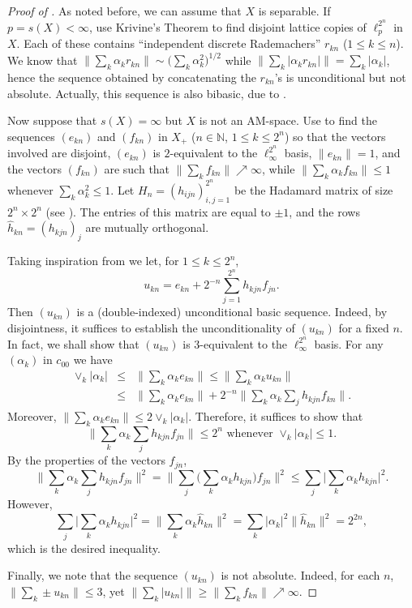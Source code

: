 \documentclass[12pt,leqno]{amsart}
\numberwithin{equation}{section}
\theoremstyle{definition}
\def\N{{\mathbb N}}
\begin{document}
\begin{proof}[Proof of ] 
As noted before, we can assume that $X$ is separable. If $p = s(X) < \infty$, use Krivine's Theorem to find disjoint lattice copies of $\ell_p^{2^n}$ in $X$.
Each of these contains ``independent discrete Rademachers'' $r_{kn}$ ($1 \leq k \leq n$). We know that $\| \sum_k \alpha_k r_{kn} \| \sim \big( \sum_k \alpha_k^2 \big)^{1/2}$ while $\| \sum_k |\alpha_k r_{kn}| \| = \sum_k |\alpha_k|$, hence the sequence obtained by concatenating the $r_{kn}$'s is  unconditional but not absolute. Actually, this sequence is also bibasic, due to \cite{TT19}.
 \medskip
 
 Now suppose that $s(X) = \infty$ but $X$ is not an AM-space. Use  to find the sequences $(e_{kn})$ and $(f_{kn})$ in $X_+$ ($n \in \N$, $1 \leq k \leq 2^n$) so that the vectors involved are disjoint, $(e_{kn})$ is $2$-equivalent to the $\ell_\infty^{2^n}$ basis, $\|e_{kn}\| = 1$, and the vectors $(f_{kn})$ are such that $\| \sum_k f_{kn} \| \nearrow \infty$, while $\| \sum_k \alpha_k f_{kn} \| \leq 1$ whenever $\sum_k \alpha_k^2 \leq 1$.
 Let $H_n = (h_{ijn})_{i,j=1}^{2^n}$ be the Hadamard matrix of size $2^n \times 2^n$ (see \cite[Section 8]{TT19}).
 The entries of this matrix are equal to $\pm 1$, and the rows $\hat{h}_{kn} = (h_{kjn})_j$ are mutually orthogonal.
 \medskip
 
 Taking inspiration from \cite{APY} we let, for $1 \leq k \leq 2^n$,
 $$
 u_{kn} = e_{kn} + 2^{-n} \sum_{j=1}^{2^n} h_{kjn} f_{jn} .
 $$
 Then $(u_{kn})$ is a (double-indexed) unconditional basic sequence. Indeed, by disjointness, it suffices to establish the unconditionality of $(u_{kn})$ for a fixed $n$.
 In fact, we shall show that $(u_{kn})$ is $3$-equivalent to the $\ell_\infty^{2^n}$ basis.
 For any $(\alpha_k)$ in $c_{00}$ we have
\begin{eqnarray*}
     \vee_k |\alpha_k| &\leq& \big\| \sum_k \alpha_k e_{kn} \big\| \leq \big\| \sum_k \alpha_k u_{kn} \big\|\\
     &\leq& \big\| \sum_k \alpha_k e_{kn} \big\| + 2^{-n} \big\| \sum_k \alpha_k \sum_j h_{kjn} f_{kn} \big\| .
\end{eqnarray*}
Moreover,  $\big\| \sum_k \alpha_k e_{kn} \big\| \leq 2 \vee_k |\alpha_k|$. Therefore, it suffices to show that
 $$
 \big\| \sum_k \alpha_k \sum_j h_{kjn} f_{jn} \big\| \leq 2^n {\textrm{  whenever  }} \vee_k |\alpha_k| \leq 1 .
 $$
 By the properties of the vectors $f_{jn}$,
 $$
 \big\| \sum_k \alpha_k \sum_j h_{kjn} f_{jn} \big\|^2 = \big\| \sum_j \big( \sum_k \alpha_k h_{kjn} \big) f_{jn} \big\|^2 \leq \sum_j \big|\sum_k \alpha_k h_{kjn} \big|^2 .
 $$
 However,
 $$
 \sum_j\big| \sum_k \alpha_k h_{kjn} \big|^2 = \big\| \sum_k \alpha_k \hat{h}_{kn} \big\|^2 = 
 \sum_k |\alpha_k|^2 \|\hat{h}_{kn}\|^2 = 2^{2n} ,
 $$
 which is the desired inequality.
 \medskip
 
 Finally, we note that the sequence $(u_{kn})$ is not absolute. Indeed, for  each $n$, $\|\sum_k \pm u_{kn}\| \leq 3$, yet $\|\sum_k |u_{kn}| \| \geq \| \sum_k f_{kn} \|\nearrow \infty$.
\end{proof}
\end{document}
